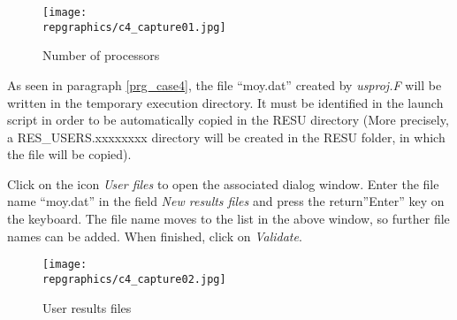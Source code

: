 \begin{figure}[h!]
\begin{center}
\texttt{[image: \\repgraphics/c4\_capture01.jpg]}
\caption{Number of processors}
\label{fig1_e4}
\end{center}
\end{figure}


\newpage
As seen in paragraph \ref{prg_case4}, the file ``moy.dat'' created by
{\itshape usproj.F} will be written in the temporary execution directory. It
must be identified in the launch script in order to be automatically copied in
the RESU directory (More precisely, a RES\_USERS.xxxxxxxx directory will be
created in the RESU folder, in which the file will be copied).

Click on the icon {\itshape User files} to open the associated dialog window.
Enter the file name ``moy.dat'' in the field {\itshape New results files}
and press the return''Enter'' key on the keyboard. The file name moves to the
list in the above window, so further file names can be added. When finished,
click on {\itshape Validate}.

\begin{figure}[h!]
\begin{center}
\texttt{[image: \\repgraphics/c4\_capture02.jpg]}
\caption{User results files}
\label{fig2_e4}
\end{center}
\end{figure}


